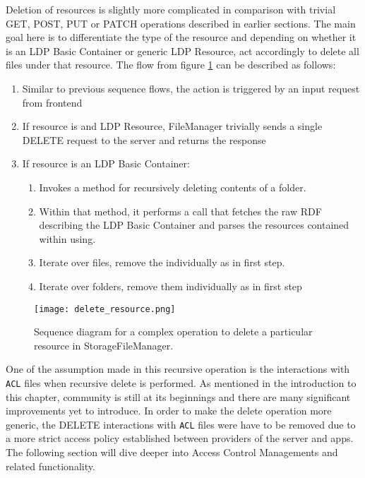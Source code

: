 Deletion of resources is slightly more complicated in comparison with  trivial GET, POST, PUT or PATCH operations described in earlier sections. The main goal here is to differentiate the type of the resource and depending on whether it is an LDP Basic Container or generic LDP Resource, act accordingly to delete all files under that resource. 
The flow from figure \ref{fig:lps_delete_resource} can be described as follows:

\begin{enumerate}
    \item Similar to previous sequence flows, the action is triggered by an input request from \lpa{} frontend
    \item If resource is and LDP Resource, FileManager trivially sends 
   	a single DELETE request to the server and returns the response
    \item If resource is an LDP Basic Container:
    	\begin{enumerate}
    	\item Invokes a method for recursively deleting contents of a folder.
    	\item Within that method, it performs a call that fetches the raw RDF describing the LDP Basic Container and parses the resources contained within using. 
    	\item Iterate over files, remove the individually as in first step.
    	\item Iterate over folders, remove them individually as in first step 
    	\end{enumerate}
\end{enumerate}


\begin{figure}[h]
\centering
\texttt{[image: delete\_resource.png]}
\caption{Sequence diagram for a complex operation to delete a particular resource in StorageFileManager.}
\label{fig:lps_delete_resource}
\end{figure}


One of the assumption made in this recursive operation is the interactions with \texttt{ACL} files when recursive delete is performed. As mentioned in the introduction to this chapter, \solid{} community is still at its beginnings and there are many significant improvements yet to introduce. In order to make the delete operation more generic, the DELETE interactions with \texttt{ACL} files were have to be removed due to a more strict access policy established between providers of the server and \solid{} apps. The following section will dive deeper into Access Control Managements and related functionality.

